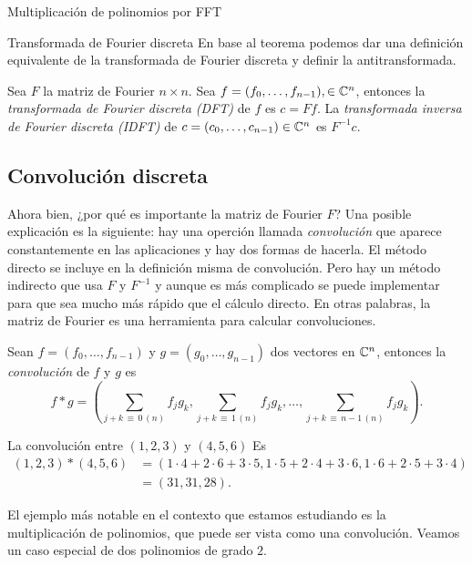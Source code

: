 \begin{chapter}{Multiplicación de polinomios por FFT}
\begin{section}{Transformada de Fourier discreta}
    En  base al teorema podemos dar una definición equivalente de la transformada de Fourier discreta y definir la antitransformada.

    \begin{definicion}
        Sea $F$ la matriz de Fourier $n \times n$. Sea  $f = (f_0,\ldots,f_{n-1}), \in \mathbb C^n$, entonces la \textit{transformada de Fourier discreta (DFT)} de $f$ es $c = Ff$. La \textit{transformada inversa de Fourier discreta (IDFT)} de $c = (c_0,\ldots,c_{n-1}) \in \mathbb C^n$ es $F^{-1}c$.
    \end{definicion}

    \subsection*{Convolución discreta}

    Ahora bien, ¿por  qué es importante la matriz de Fourier $F$? Una posible explicación es la siguiente: hay una operción llamada \textit{convolución} que aparece constantemente en las aplicaciones y hay dos formas de hacerla. El método directo se incluye en la definición misma de convolución. Pero  hay un método indirecto que usa $F$ y $F^{-1}$ y aunque es más complicado se puede implementar para que sea mucho más rápido que el cálculo directo. En otras palabras,  la matriz de Fourier es una herramienta para calcular convoluciones.

    \begin{definicion}
        Sean $f = (f_0,\ldots, f_{n-1})$ y $g = (g_0,\ldots, g_{n-1})$ dos vectores en $\mathbb C^n$,  entonces la  \textit{convolución} de $f$ y $g$ es
        \begin{equation*}
            f * g = \left(\sum_{j+k \,\equiv\, 0\, (n)} f_jg_k, \sum_{j+k \,\equiv\, 1\, (n)} f_jg_k, \ldots, \sum_{j+k\, \equiv\, n-1 \,(n)} f_jg_k\right).
        \end{equation*}
    \end{definicion}

    \begin{ejemplo}
        La convolución entre $(1,2,3)$ y $(4,5,6)$ Es
        \begin{align*}
            (1,2,3)*(4,5,6) & = (1 \cdot 4 + 2\cdot 6 + 3\cdot 5, 1\cdot 5+  2\cdot 4 + 3\cdot 6, 1\cdot 6 + 2\cdot 5 + 3\cdot 4) \\ &= (31, 31, 28).
        \end{align*}
    \end{ejemplo}

    \begin{ejemplo}\label{ejem-convolucion-polinomios}
        El ejemplo más notable en el contexto  que estamos estudiando es la multiplicación de polinomios, que puede ser vista como  una convolución. Veamos un caso especial de dos polinomios de grado $2$.


\end{ejemplo}
\end{section}
\end{chapter}
